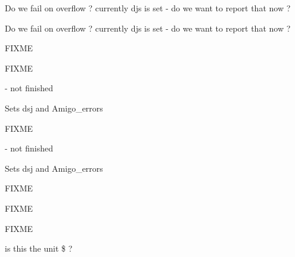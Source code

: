 
\begin{DoxyRefList}
\item[\label{todo__todo000004}%
\hypertarget{todo__todo000004}{}%
Global \hyperlink{amigo_8h_a4934ae332e168979dbb865a9948de88b}{amigo\+\_\+buffered\+\_\+read} (void)]Do we fail on overflow ? currently djs is set -\/ do we want to report that now ?  
\item[\label{todo__todo000004}%
\hypertarget{todo__todo000004}{}%
Global \hyperlink{amigo_8h_a4934ae332e168979dbb865a9948de88b}{amigo\+\_\+buffered\+\_\+read} (void)]Do we fail on overflow ? currently djs is set -\/ do we want to report that now ?  
\item[\label{todo__todo000007}%
\hypertarget{todo__todo000007}{}%
Global \hyperlink{amigo_8h_ae61925e6fb971862b8b0390c67bc164c}{amigo\+\_\+cmd\+\_\+clear} (void)]F\+I\+X\+ME 
\item[\label{todo__todo000007}%
\hypertarget{todo__todo000007}{}%
Global \hyperlink{amigo_8h_ae61925e6fb971862b8b0390c67bc164c}{amigo\+\_\+cmd\+\_\+clear} (void)]F\+I\+X\+ME 
\item[\label{todo__todo000005}%
\hypertarget{todo__todo000005}{}%
Global \hyperlink{amigo_8h_a1893674c480c08927066d7e10029d01c}{amigo\+\_\+cmd\+\_\+wakeup} (void)]-\/ not finished
\begin{DoxyItemize}
\item Sets dsj and Amigo\+\_\+errors
\end{DoxyItemize}

F\+I\+X\+ME  
\item[\label{todo__todo000005}%
\hypertarget{todo__todo000005}{}%
Global \hyperlink{amigo_8h_a1893674c480c08927066d7e10029d01c}{amigo\+\_\+cmd\+\_\+wakeup} (void)]-\/ not finished
\begin{DoxyItemize}
\item Sets dsj and Amigo\+\_\+errors
\end{DoxyItemize}

F\+I\+X\+ME  
\item[\label{todo__todo000008}%
\hypertarget{todo__todo000008}{}%
Global \hyperlink{amigo_8h_a2fc6f1413199d33d2b32e675dd45e181}{Amigo\+\_\+\+Command} (int secondary)]F\+I\+X\+ME 

F\+I\+X\+ME 

is this the unit \$ ? 


\end{DoxyRefList}

